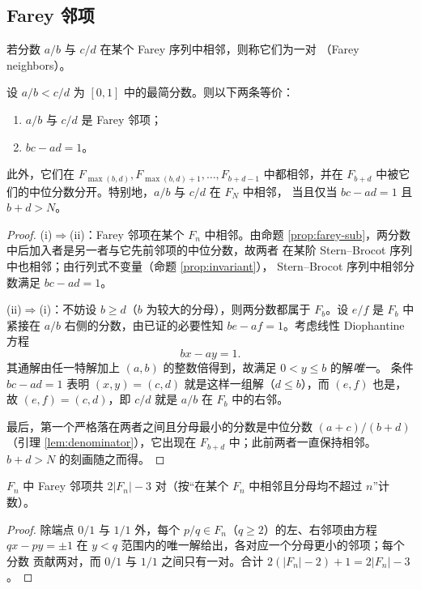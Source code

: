\subsection{Farey 邻项}

\begin{definition}[Farey 邻项]
若分数 $a/b$ 与 $c/d$ 在某个 Farey 序列中相邻，则称它们为一对
（Farey neighbors）。
\end{definition}

\begin{theorem}\label{thm:farey-neighbor}
设 $a/b<c/d$ 为 $[0,1]$ 中的最简分数。则以下两条等价：
\begin{enumerate}[label=(\roman*)]
  \item $a/b$ 与 $c/d$ 是 Farey 邻项；
  \item $bc-ad=1$。
\end{enumerate}
此外，它们在 $F_{\max(b,d)},F_{\max(b,d)+1},\ldots,F_{b+d-1}$ 中都相邻，并在
$F_{b+d}$ 中被它们的中位分数分开。特别地，$a/b$ 与 $c/d$ 在 $F_N$ 中相邻，
当且仅当 $bc-ad=1$ 且 $b+d>N$。
\end{theorem}

\begin{proof}
(i)$\Rightarrow$(ii)：Farey 邻项在某个 $F_n$ 中相邻。由命题
\ref{prop:farey-sub}，两分数中后加入者是另一者与它先前邻项的中位分数，故两者
在某阶 Stern--Brocot 序列中也相邻；由行列式不变量（命题 \ref{prop:invariant}），
Stern--Brocot 序列中相邻分数满足 $bc-ad=1$。

(ii)$\Rightarrow$(i)：不妨设 $b\ge d$（$b$ 为较大的分母），则两分数都属于
$F_b$。设 $e/f$ 是 $F_b$ 中紧接在 $a/b$ 右侧的分数，由已证的必要性知
$be-af=1$。考虑线性 Diophantine 方程
\[
  bx-ay=1.
\]
其通解由任一特解加上 $(a,b)$ 的整数倍得到，故满足 $0<y\le b$ 的解\emph{唯一}。
条件 $bc-ad=1$ 表明 $(x,y)=(c,d)$ 就是这样一组解（$d\le b$），而 $(e,f)$ 也是，
故 $(e,f)=(c,d)$，即 $c/d$ 就是 $a/b$ 在 $F_b$ 中的右邻。

最后，第一个严格落在两者之间且分母最小的分数是中位分数 $(a+c)/(b+d)$
（引理 \ref{lem:denominator}），它出现在 $F_{b+d}$ 中；此前两者一直保持相邻。
$b+d>N$ 的刻画随之而得。
\end{proof}

\begin{corollary}[邻项总数]
$F_n$ 中 Farey 邻项共 $2|F_n|-3$ 对（按``在某个 $F_n$ 中相邻且分母均不超过
$n$''计数）。
\end{corollary}

\begin{proof}
除端点 $0/1$ 与 $1/1$ 外，每个 $p/q\in F_n$（$q\ge2$）的左、右邻项由方程
$qx-py=\pm1$ 在 $y<q$ 范围内的唯一解给出，各对应一个分母更小的邻项；每个分数
贡献两对，而 $0/1$ 与 $1/1$ 之间只有一对。合计 $2(|F_n|-2)+1=2|F_n|-3$。
\end{proof}

